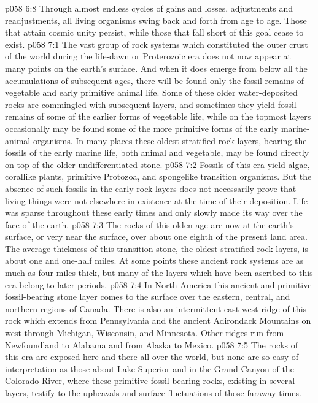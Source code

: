 \vs p058 6:8 Through almost endless cycles of gains and losses, adjustments and readjustments, all living organisms swing back and forth from age to age. Those that attain cosmic unity persist, while those that fall short of this goal cease to exist.
\vs p058 7:1 The vast group of rock systems which constituted the outer crust of the world during the life\hyp{}dawn or Proterozoic era does not now appear at many points on the earth’s surface. And when it does emerge from below all the accumulations of subsequent ages, there will be found only the fossil remains of vegetable and early primitive animal life. Some of these older water\hyp{}deposited rocks are commingled with subsequent layers, and sometimes they yield fossil remains of some of the earlier forms of vegetable life, while on the topmost layers occasionally may be found some of the more primitive forms of the early marine\hyp{}animal organisms. In many places these oldest stratified rock layers, bearing the fossils of the early marine life, both animal and vegetable, may be found directly on top of the older undifferentiated stone.
\vs p058 7:2 Fossils of this era yield algae, corallike plants, primitive Protozoa, and spongelike transition organisms. But the absence of such fossils in the early rock layers does not necessarily prove that living things were not elsewhere in existence at the time of their deposition. Life was sparse throughout these early times and only slowly made its way over the face of the earth.
\pc \vs p058 7:3 The rocks of this olden age are now at the earth’s surface, or very near the surface, over about one eighth of the present land area. The average thickness of this transition stone, the oldest stratified rock layers, is about one and one\hyp{}half miles. At some points these ancient rock systems are as much as four miles thick, but many of the layers which have been ascribed to this era belong to later periods.
\vs p058 7:4 In North America this ancient and primitive fossil\hyp{}bearing stone layer comes to the surface over the eastern, central, and northern regions of Canada. There is also an intermittent east\hyp{}west ridge of this rock which extends from Pennsylvania and the ancient Adirondack Mountains on west through Michigan, Wisconsin, and Minnesota. Other ridges run from Newfoundland to Alabama and from Alaska to Mexico.
\vs p058 7:5 The rocks of this era are exposed here and there all over the world, but none are so easy of interpretation as those about Lake Superior and in the Grand Canyon of the Colorado River, where these primitive fossil\hyp{}bearing rocks, existing in several layers, testify to the upheavals and surface fluctuations of those faraway times.
